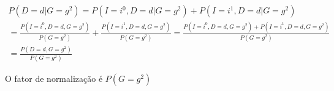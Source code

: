 \item
\[\begin{array}{l}
P(D = d|G = {g^2}) = P(I = {i^0},D = d|G = {g^2}) + P(I = {i^1},D = d|G = {g^2})\\
 = \frac{{P(I = {i^0},D = d,G = {g^2})}}{{P(G = {g^2})}} + \frac{{P(I = {i^1},D = d,G = {g^2})}}{{P(G = {g^2})}} = \frac{{P(I = {i^0},D = d,G = {g^2}) + P(I = {i^1},D = d,G = {g^2})}}{{P(G = {g^2})}}\\
 = \frac{{P(D = d,G = {g^2})}}{{P(G = {g^2})}}
\end{array}\]

O fator de normalização é ${P(G = {g^2})}$
 
